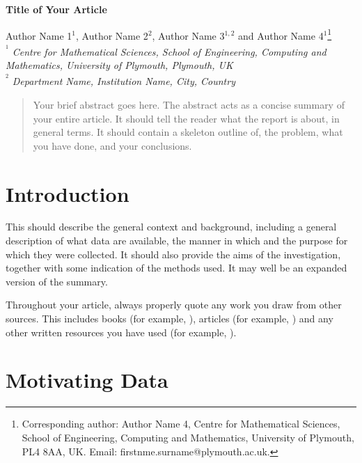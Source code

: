 \documentclass[a4paper,amsmath, 12pt]{article}
\begin{document}
\begin{center}
\textbf{\Large Title of Your Article}

\vspace{0.5cm}

Author Name 1$^{1}$, Author Name 2$^{2}$,  Author Name 3$^{1,2}$ and Author Name 4$^{1}$\footnote[1]{Corresponding author: Author Name 4, Centre for Mathematical Sciences, School of Engineering, Computing and Mathematics, University of Plymouth, PL4 8AA, UK. Email: firstnme.surname@plymouth.ac.uk.} \\

{\it{\textsuperscript{$^{1}$} Centre for Mathematical Sciences,  School of Engineering, Computing and Mathematics, University of Plymouth, Plymouth, UK \\}}
{\it{\textsuperscript{$^{2}$} Department Name, Institution Name, City, Country}}
\end{center}


\begin{abstract}
\noindent
Your brief abstract goes here. The abstract acts as a concise summary of your entire article. It should tell the reader what the report is about, in general terms. It should contain a skeleton
outline of,  the problem, what you have done, and your conclusions.


\end{abstract}


\section{Introduction}
This should describe the general context and background, including a general
description of what data are available, the manner in which and the purpose for
which they were collected.  It should also provide the aims of the investigation,
together with some indication of the methods used. It may well be an expanded
version of the summary.

Throughout your article, always properly quote any work you draw from other sources. This includes books (for example, \cite{james:2013} ), articles (for example, \cite{Seiichiro:2011}) and any other written resources you have used (for example, \cite{ONS}). \\

\section{Motivating Data}
\end{document}
